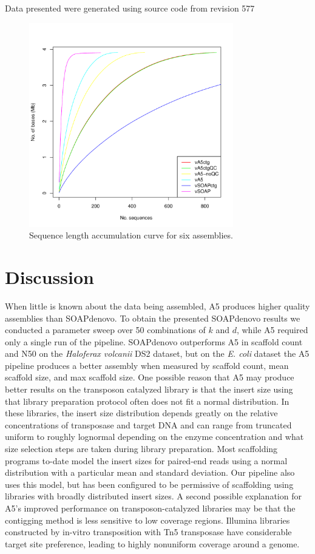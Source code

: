 \documentclass{bioinfo}
\begin{document}
Data presented were generated using source code from revision 577

\begin{figure}[t]
\includegraphics[width=3.5in]{volc_accum_plot.pdf}
\vspace{-1cm}
\caption{Sequence length accumulation curve for six assemblies.}\label{fig:01}
\end{figure}

\section{Discussion}

When little is known about the data being assembled, A5 produces higher quality assemblies 
than SOAPdenovo. To obtain the presented SOAPdenovo results we conducted a parameter sweep 
over 50 combinations of $k$ and $d$, while A5 required
only a single run of the pipeline.
SOAPdenovo outperforms A5 in scaffold count and N50 on the \textit{Haloferax volcanii} DS2 dataset, but on the \textit{E. coli} dataset the
A5 pipeline produces a better assembly when measured by scaffold count, mean scaffold size, and max scaffold size.
One possible reason that A5 may produce better results on the transposon catalyzed library is that the insert size using
that library preparation protocol often does not fit a normal distribution.  In these libraries, the insert size 
distribution depends greatly on the relative concentrations of transposase and target DNA and can range from truncated uniform
to roughly lognormal depending on the enzyme concentration and what size selection steps are taken during library preparation.
Most scaffolding programs to-date model the insert sizes for paired-end reads using a normal distribution with a particular
mean and standard deviation. Our pipeline also uses this model, but has been configured to be permissive of scaffolding
using libraries with broadly distributed insert sizes.  A second possible explanation for A5's improved performance on transposon-catalyzed 
libraries may be that the contigging method is less sensitive to low coverage regions.  Illumina libraries constructed by in-vitro 
transposition with Tn5 transposase have considerable target site preference, leading to highly nonuniform coverage around a genome.
\end{document}
